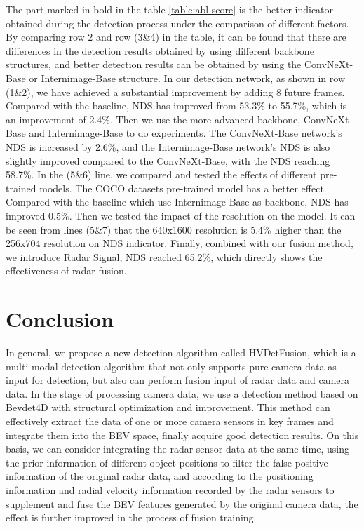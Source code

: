 \documentclass[10pt,twocolumn,letterpaper]{article}
\begin{document}
   The part marked in bold in the table  \ref{table:abl-score} is the better indicator obtained during the detection process under the comparison of different factors. By comparing row 2 and row (3\&4) in the table, it can be found that there are differences in the detection results obtained by using different backbone structures, and better detection results can be obtained by using the ConvNeXt-Base or Internimage-Base structure. In our detection network, as shown in row (1\&2), we have achieved a substantial improvement by adding 8 future frames. Compared with the baseline, NDS has improved from 53.3\% to 55.7\%, which is an improvement of 2.4\%. Then we use the more advanced backbone, ConvNeXt-Base and Internimage-Base to do experiments. The ConvNeXt-Base network's NDS is increased by 2.6\%, and the Internimage-Base network's NDS is also slightly improved compared to the ConvNeXt-Base, with the NDS reaching 58.7\%. In the (5\&6) line, we compared and tested the effects of different pre-trained models. The COCO datasets pre-trained model has a better effect. Compared with the baseline which use Internimage-Base as backbone, NDS has improved 0.5\%. Then we tested the impact of the resolution on the model. It can be seen from lines (5\&7) that the 640x1600 resolution is 5.4\% higher than the 256x704 resolution on NDS indicator. Finally, combined with our fusion method, we introduce Radar Signal, NDS reached 65.2\%, which directly shows the effectiveness of radar fusion.

\section{Conclusion}

   In general, we propose a new detection algorithm called HVDetFusion, which is a multi-modal detection algorithm that not only supports pure camera data as input for detection, but also can perform fusion input of radar data and camera data. In the stage of processing camera data, we use a detection method based on Bevdet4D with structural optimization and improvement. This method can effectively extract the data of one or more camera sensors in key frames and integrate them into the BEV space, finally acquire good detection results. On this basis, we can consider integrating the radar sensor data at the same time, using the prior information of different object positions to filter the false positive information of the original radar data, and according to the positioning information and radial velocity information recorded by the radar sensors to supplement and fuse the BEV features generated by the original camera data, the effect is further improved in the process of fusion training.

\printbibliography
\end{document}
